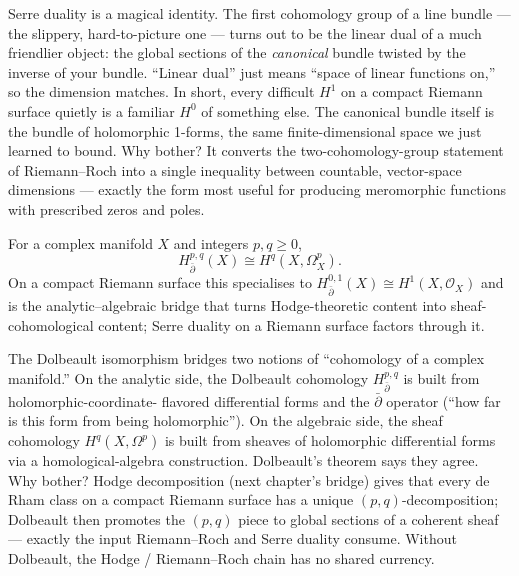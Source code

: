 \begin{layman}
Serre duality is a magical identity. The first cohomology group of a
line bundle --- the slippery, hard-to-picture one --- turns out to be the
linear dual of a much friendlier object: the global sections of the
\emph{canonical} bundle twisted by the inverse of your bundle. ``Linear
dual'' just means ``space of linear functions on,'' so the dimension
matches. In short, every difficult \(H^1\) on a compact Riemann surface
quietly is a familiar \(H^0\) of something else. The canonical bundle
itself is the bundle of holomorphic 1-forms, the same finite-dimensional
space we just learned to bound. Why bother? It converts the
two-cohomology-group statement of Riemann--Roch into a single inequality
between countable, vector-space dimensions --- exactly the form most useful
for producing meromorphic functions with prescribed zeros and poles.
\end{layman}

\begin{theorem}
\label{input:dolbeault}
For a complex manifold \(X\) and integers \(p,q\geq 0\),
\[
  H^{p,q}_{\bar\partial}(X)\cong H^{q}(X,\Omega^{p}_{X}).
\]
On a compact Riemann surface this specialises to
\(H^{0,1}_{\bar\partial}(X)\cong H^{1}(X,\mathcal{O}_X)\) and is the
analytic--algebraic bridge that turns Hodge-theoretic content into
sheaf-cohomological content; Serre duality on a Riemann surface
factors through it.
\leanok
\end{theorem}

\begin{layman}
The Dolbeault isomorphism bridges two notions of ``cohomology of a
complex manifold.'' On the analytic side, the Dolbeault cohomology
\(H^{p,q}_{\bar\partial}\) is built from holomorphic-coordinate-
flavored differential forms and the \(\bar\partial\) operator
(``how far is this form from being holomorphic''). On the
algebraic side, the sheaf cohomology \(H^q(X,\Omega^p)\) is built
from sheaves of holomorphic differential forms via a
homological-algebra construction. Dolbeault's theorem says they
agree. Why bother? Hodge decomposition (next chapter's bridge)
gives that every de Rham class on a compact Riemann surface has a
unique \((p,q)\)-decomposition; Dolbeault then promotes the
\((p,q)\) piece to global sections of a coherent sheaf --- exactly
the input Riemann--Roch and Serre duality consume. Without
Dolbeault, the Hodge / Riemann--Roch chain has no shared currency.
\end{layman}


